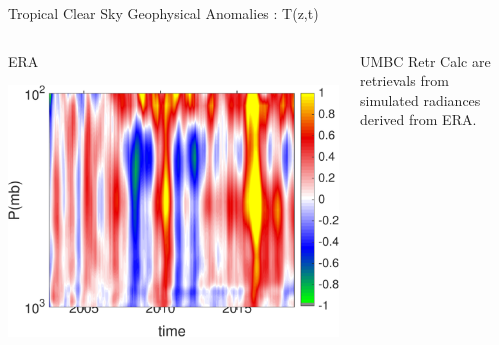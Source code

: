 \documentclass[10pt,t]{beamer}
\begin{document}

\begin{frame}{Tropical Clear Sky Geophysical Anomalies : T(z,t)}
\vspace{-0.35in}

\begin{columns}
\begin{column}{0.45\columnwidth}
\begin{block}{\footnotesize ERA}
\vspace{-0.1in}
\begin{center}
\includegraphics[width=\linewidth]{Figs/ClearAnom/era_clr_ptemp_anom_200209_201808.png}
\end{center}
\end{block}
\end{column}

\begin{column}{0.45\columnwidth}
\begin{block}{}
UMBC Retr Calc are retrievals from simulated radiances derived from ERA.
\end{block}
\end{column}
\end{columns}

\vspace{-0.25in}


\end{frame}
\end{document}
